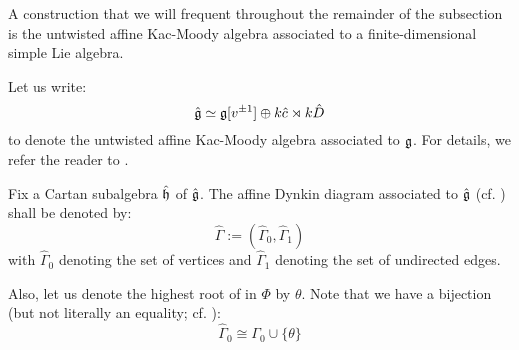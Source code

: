         A construction that we will frequent throughout the remainder of the subsection is the untwisted affine Kac-Moody algebra associated to a finite-dimensional simple Lie algebra.
        \begin{convention} \label{conv: a_fixed_untwisted_affine_kac_moody_algebra}
            Let us write:
                $$\hat{\mathfrak{g}} \simeq \mathfrak{g}[v^{\pm 1}] \oplus k \hat{c} \rtimes k \hat{D}$$
            to denote the untwisted affine Kac-Moody algebra associated to $\mathfrak{g}$. For details, we refer the reader to \cite[Chapter 7]{kac_infinite_dimensional_lie_algebras}.

            Fix a Cartan subalgebra $\hat{\mathfrak{h}}$ of $\hat{\mathfrak{g}}$. The affine Dynkin diagram associated to $\hat{\mathfrak{g}}$ (cf. \cite[Chapter 4]{kac_infinite_dimensional_lie_algebras}) shall be denoted by:
                $$\hat{\Gamma} := ( \hat{\Gamma}_0, \hat{\Gamma}_1 )$$
            with $\hat{\Gamma}_0$ denoting the set of vertices and $\hat{\Gamma}_1$ denoting the set of undirected edges.

            Also, let us denote the highest root of in $\Phi$ by $\theta$. Note that we have a bijection (but not literally an equality; cf. \cite[Chapter 6]{kac_infinite_dimensional_lie_algebras}):
                $$\hat{\Gamma}_0 \cong \Gamma_0 \cup \{\theta\}$$
        \end{convention}

